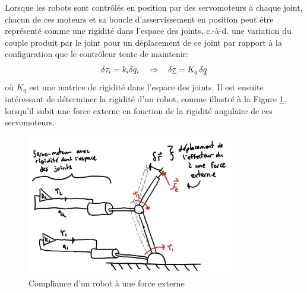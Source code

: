 Lorsque les robots sont contrôlés en position par des servomoteurs à chaque joint, chacun de ces moteurs et sa boucle d'asservissement en position peut être représenté comme une rigidité dans l'espace des joints, c.-à-d. une variation du couple produit par le joint pour un déplacement de ce joint par rapport à la configuration que le contrôleur tente de maintenir:
\begin{align}
	\delta \tau_i = k_i \delta q_i \quad \Rightarrow \quad \delta \underline{\tau} = K_q \, \delta \underline{q}
\end{align}
où $K_q$ est une matrice de rigidité dans l'espace des joints. Il est ensuite intéressant de déterminer la rigidité d'un robot, comme illustré à la Figure \ref{fig:robotcompliance}, lorsqu'il subit une force externe en fonction de la rigidité angulaire de ces servomoteurs.
\begin{figure}[htbp]
	\centering
	\includegraphics[width=0.80\textwidth]{fig/robotcompliance.jpg}
	\caption{Compliance d'un robot à une force externe}
	\label{fig:robotcompliance}
\end{figure}

